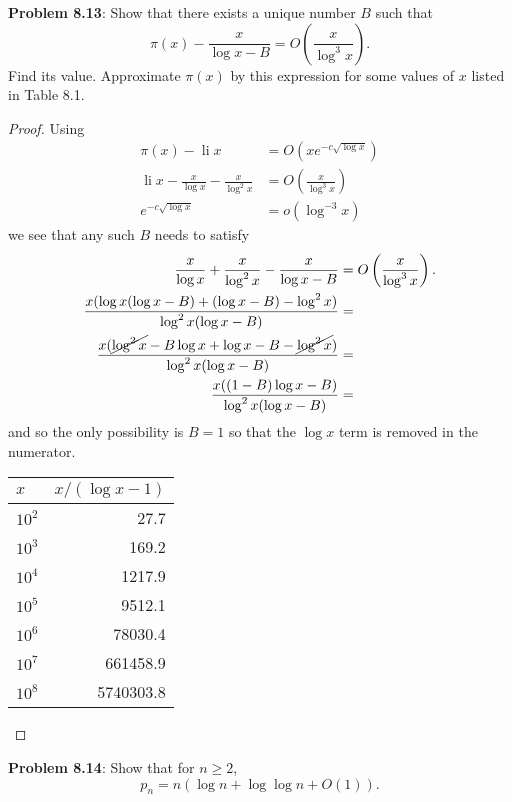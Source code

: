 \documentclass[12pt]{article}
\DeclareMathOperator{\li}{li}
\renewcommand{\O}[1]{O\left( #1 \right)}
\begin{document}
\textbf{Problem 8.13}: Show that there exists a unique number $B$ such that
$$\pi(x) - \frac{x}{\log x - B} = \O{\frac{x}{\log^3 x}}.$$
Find its value. Approximate $\pi(x)$ by this expression for some values of $x$ listed in Table 8.1.

\begin{proof}
Using
\begin{align*}
\pi(x) - \li x &= \O{x e^{-c\sqrt{\log x}}}\\
\li x - \frac{x}{\log x} - \frac{x}{\log^2 x} &= \O{\frac{x}{\log^3 x}}\\
e^{-c\sqrt{\log x}} &= o(\log^{-3} x)
\end{align*}
we see that any such $B$ needs to satisfy
\begin{align*}
\frac{x}{\log x} + \frac{x}{\log^2 x} - \frac{x}{\log x - B} &= \O{\frac{x}{\log^3 x}}.\\
\frac{x(\log x(\log x - B) + (\log x - B) - \log^2 x)}{\log^2 x (\log x - B)} &=\\
\frac{x(\cancel{\log^2 x} - B \log x + \log x - B - \cancel{\log^2 x})}{\log^2 x (\log x - B)} &=\\
\frac{x((1 - B) \log x - B)}{\log^2 x (\log x - B)} &=
\end{align*}
and so the only possibility is $B = 1$ so that the $\log x$ term is removed in the numerator.

\begin{center}
\begin{tabular}{ l r }
$x$ & $x/(\log x - 1)$\\
\hline
$10^2$ & 27.7 \\
$10^3$ & 169.2 \\
$10^4$ & 1217.9 \\
$10^5$ & 9512.1 \\
$10^6$ & 78030.4 \\
$10^7$ & 661458.9 \\
$10^8$ & 5740303.8 \\
\hline
\end{tabular}
\end{center}
\end{proof}

\textbf{Problem 8.14}: Show that for $n \geq 2$,
$$p_n = n ( \log n + \log \log n + O(1) ).$$
\end{document}
